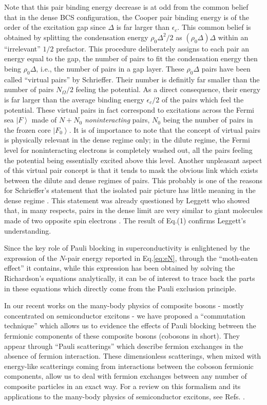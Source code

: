 \documentclass[aps,prb,superscriptaddress,showpacs,reprint,lengthcheck]{revtex4-1}
\begin{document}
Note that this pair binding energy decrease is at odd from
the common belief that in the dense BCS configuration, the Cooper pair
binding energy is of the order of the excitation gap since  $\Delta $ is far larger
than $\epsilon _{c}$. This common belief is obtained by splitting the
condensation energy $\rho _{0}\Delta ^{2}/2$ as $(\rho _{0}\Delta )\Delta $
within an ``irrelevant'' $1/2$ prefactor. This procedure deliberately assigns to each pair an
energy equal to the gap, the number of pairs to fit the condensation energy
then being $\rho _{0}\Delta $, i.e., the number of pairs in a gap layer. These $\rho
_{0}\Delta $ pairs have been called ``virtual pairs'' by Schrieffer.
Their number is definitly far smaller than the number of pairs $N_{\Omega }/2$ feeling
the potential. As a direct consequence, their energy is far larger than the average binding energy $%
\epsilon _{c}/2$ of the pairs which feel the potential. These virtual pairs in fact correspond
to excitations across the Fermi sea $\left\vert F\right\rangle $ made of $%
N+N_{0}$ \textit{noninteracting} pairs, $N_{0}$ being the number of pairs in
the frozen core $\left\vert F_{0}\right\rangle $. It is of importance to note that the concept of virtual
pairs is physically relevant in the dense regime only; in the
dilute regime, the Fermi level for noninteracting electrons is completely
washed out, all the pairs feeling the potential being essentially excited above this level.
Another unpleasant aspect of this virtual pair concept is that it tends to 
mask the obvious link which exists between the dilute and dense regimes of pairs. 
This probably is one of the reasons for Schrieffer's statement that the
isolated pair picture has little meaning in the dense regime
\cite{Schrieffer}. This statement was already questioned by Leggett who
showed that, in many respects, pairs in the dense limit are very similar to giant molecules made of two opposite spin electrons \cite{LeggettCrossover}. The result of Eq.(1) confirms Leggett's understanding. 

Since the key role of Pauli blocking in superconductivity is enlightened by
the expression of the $N$-pair energy reported in Eq.\eqref{eq:eN}, through the ``moth-eaten effect'' it contains, 
while this expression has been obtained by solving the
Richardson's equations analytically, it can be of interest to trace back the parts in
these equations which directly come from the Pauli exclusion principle.

In our recent works on the many-body physics of composite bosons - mostly concentrated on semiconductor excitons - we have
proposed a ``commutation technique'' which allows us to evidence the effects
of Pauli blocking between the fermionic components of these composite
bosons (cobosons in short). They appear through ``Pauli scatterings'' which describe fermion
exchanges in the absence of fermion interaction. These dimensionless
scatterings, when mixed with energy-like scatterings coming from interactions
between the coboson fermionic components, allow us to deal with fermion exchanges
between any number of composite particles in an exact way. For a review on
this formalism and its applications to the many-body physics of
semiconductor excitons, see Refs. \cite%
{CobosonPhysicsReports}.
\end{document}
